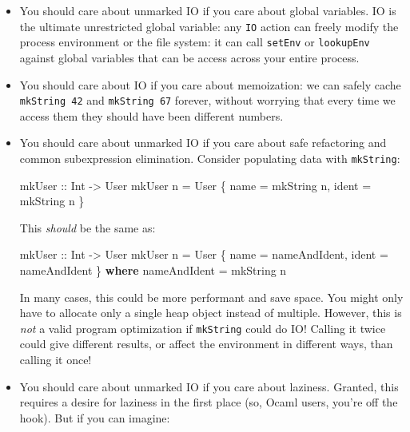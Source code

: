 \documentclass[]{article}
\newenvironment{Shaded}{}{}
\newcommand{\DataTypeTok}[1]{\textcolor[rgb]{0.56,0.13,0.00}{#1}}
\newcommand{\KeywordTok}[1]{\textcolor[rgb]{0.00,0.44,0.13}{\textbf{#1}}}
\newcommand{\NormalTok}[1]{#1}
\newcommand{\OtherTok}[1]{\textcolor[rgb]{0.00,0.44,0.13}{#1}}
\begin{document}
\begin{itemize}
\item
  You should care about unmarked IO if you care about global variables. IO is
  the ultimate unrestricted global variable: any \texttt{IO} action can freely
  modify the process environment or the file system: it can call \texttt{setEnv}
  or \texttt{lookupEnv} against global variables that can be access across your
  entire process.
\item
  You should care about IO if you care about memoization: we can safely cache
  \texttt{mkString\ 42} and \texttt{mkString\ 67} forever, without worrying that
  every time we access them they should have been different numbers.
\item
  You should care about unmarked IO if you care about safe refactoring and
  common subexpression elimination. Consider populating data with
  \texttt{mkString}:

\begin{Shaded}
\begin{Highlighting}[]
\OtherTok{mkUser ::} \DataTypeTok{Int} \OtherTok{{-}\textgreater{}} \DataTypeTok{User}
\NormalTok{mkUser n }\OtherTok{=} \DataTypeTok{User}\NormalTok{ \{ name }\OtherTok{=}\NormalTok{ mkString n, ident }\OtherTok{=}\NormalTok{ mkString n \}}
\end{Highlighting}
\end{Shaded}

  This \emph{should} be the same as:

\begin{Shaded}
\begin{Highlighting}[]
\OtherTok{mkUser ::} \DataTypeTok{Int} \OtherTok{{-}\textgreater{}} \DataTypeTok{User}
\NormalTok{mkUser n }\OtherTok{=} \DataTypeTok{User}\NormalTok{ \{ name }\OtherTok{=}\NormalTok{ nameAndIdent, ident }\OtherTok{=}\NormalTok{ nameAndIdent \}}
  \KeywordTok{where}
\NormalTok{    nameAndIdent }\OtherTok{=}\NormalTok{ mkString n}
\end{Highlighting}
\end{Shaded}

  In many cases, this could be more performant and save space. You might only
  have to allocate only a single heap object instead of multiple. However, this
  is \emph{not} a valid program optimization if \texttt{mkString} could do IO!
  Calling it twice could give different results, or affect the environment in
  different ways, than calling it once!
\item
  You should care about unmarked IO if you care about laziness. Granted, this
  requires a desire for laziness in the first place (so, Ocaml users, you're off
  the hook). But if you can imagine:


\end{itemize}
\end{document}
